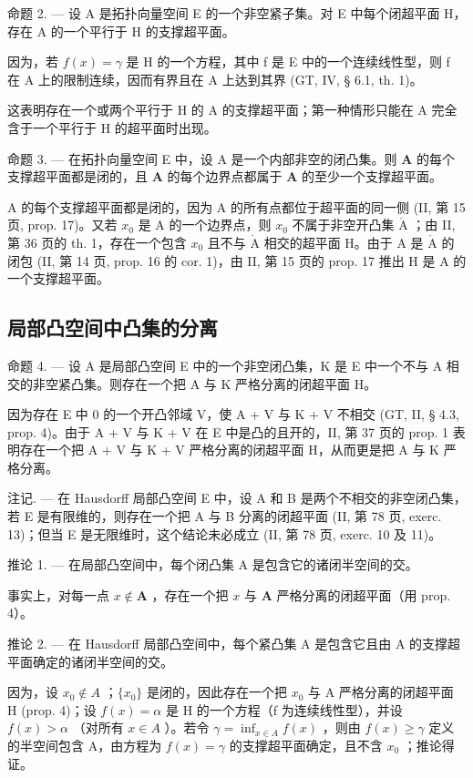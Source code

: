 命题 2. --- 设 A 是拓扑向量空间 E 的一个非空紧子集。对 E 中每个闭超平面 H，存在 A 的一个平行于 H 的支撑超平面。

因为，若 \(f(x) = \gamma\) 是 H 的一个方程，其中 f 是 E 中的一个连续线性型，则 f 在 A 上的限制连续，因而有界且在 A 上达到其界 (GT, IV, § 6.1, th. 1)。

这表明存在一个或两个平行于 H 的 A 的支撑超平面；第一种情形只能在 A 完全含于一个平行于 H 的超平面时出现。

命题 3. --- 在拓扑向量空间 E 中，设 A 是一个内部非空的闭凸集。则 \(\mathbf{A}\) 的每个支撑超平面都是闭的，且 \(\mathbf{A}\) 的每个边界点都属于 \(\mathbf{A}\) 的至少一个支撑超平面。

A 的每个支撑超平面都是闭的，因为 A 的所有点都位于超平面的同一侧 (II, 第 15 页, prop. 17)。又若 \(x_0\) 是 A 的一个边界点，则 \(x_0\) 不属于非空开凸集 \(\mathring{\mathrm{A}}\) ；由 II, 第 36 页的 th. 1，存在一个包含 \(x_0\) 且不与 \(\mathring{\mathrm{A}}\) 相交的超平面 H。由于 A 是 \(\mathring{\mathrm{A}}\) 的闭包 (II, 第 14 页, prop. 16 的 cor. 1)，由 II, 第 15 页的 prop. 17 推出 H 是 A 的一个支撑超平面。

\subsection{局部凸空间中凸集的分离}

命题 4. --- 设 A 是局部凸空间 E 中的一个非空闭凸集，K 是 E 中一个不与 A 相交的非空紧凸集。则存在一个把 A 与 K 严格分离的闭超平面 H。

因为存在 E 中 0 的一个开凸邻域 V，使 A + V 与 K + V 不相交 (GT, II, § 4.3, prop. 4)。由于 A + V 与 K + V 在 E 中是凸的且开的，II, 第 37 页的 prop. 1 表明存在一个把 A + V 与 K + V 严格分离的闭超平面 H，从而更是把 A 与 K 严格分离。

注记. --- 在 Hausdorff 局部凸空间 E 中，设 A 和 B 是两个不相交的非空闭凸集，若 E 是有限维的，则存在一个把 A 与 B 分离的闭超平面 (II, 第 78 页, exerc. 13)；但当 E 是无限维时，这个结论未必成立 (II, 第 78 页, exerc. 10 及 11)。

推论 1. --- 在局部凸空间中，每个闭凸集 A 是包含它的诸闭半空间的交。

事实上，对每一点 \(x \notin \mathbf{A}\) ，存在一个把 \(x\) 与 \(\mathbf{A}\) 严格分离的闭超平面（用 prop. 4）。

推论 2. --- 在 Hausdorff 局部凸空间中，每个紧凸集 A 是包含它且由 A 的支撑超平面确定的诸闭半空间的交。

因为，设 \(x_{0} \notin A\) ；\(\{x_{0}\}\) 是闭的，因此存在一个把 \(x_{0}\) 与 A 严格分离的闭超平面 H (prop. 4)；设 \(f(x) = \alpha\) 是 H 的一个方程（f 为连续线性型），并设 \(f(x) > \alpha\) （对所有 \(x \in A\) ）。若令 \(\gamma = \inf_{x \in A} f(x)\) ，则由 \(f(x) \geqslant \gamma\) 定义的半空间包含 A，由方程为 \(f(x) = \gamma\) 的支撑超平面确定，且不含 \(x_{0}\) ；推论得证。


